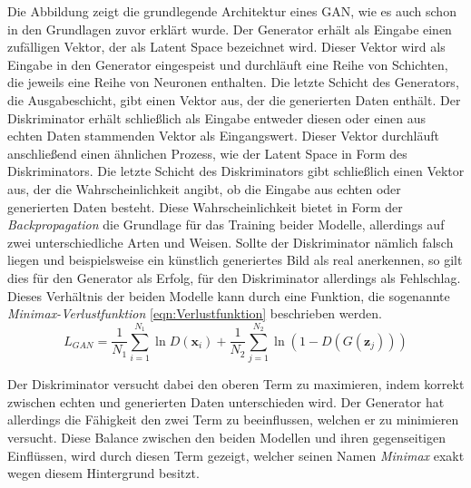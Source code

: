     \noindent Die Abbildung zeigt die grundlegende Architektur eines \ac{GAN}, wie es auch schon in den Grundlagen zuvor erklärt wurde. Der Generator erhält als Eingabe einen zufälligen Vektor, der als Latent Space bezeichnet wird. Dieser Vektor wird als Eingabe in den Generator eingespeist und durchläuft eine Reihe von Schichten, die jeweils eine Reihe von Neuronen enthalten. Die letzte Schicht des Generators, die Ausgabeschicht, gibt einen Vektor aus, der die generierten Daten enthält. Der Diskriminator erhält schließlich als Eingabe entweder diesen oder einen aus echten Daten stammenden Vektor als Eingangswert. Dieser Vektor durchläuft anschließend einen ähnlichen Prozess, wie der Latent Space in Form des Diskriminators. Die letzte Schicht des Diskriminators gibt schließlich einen Vektor aus, der die Wahrscheinlichkeit angibt, ob die Eingabe aus echten oder generierten Daten besteht. Diese Wahrscheinlichkeit bietet in Form der \textit{Backpropagation} die Grundlage für das Training beider Modelle, allerdings auf zwei unterschiedliche Arten und Weisen. Sollte der Diskriminator nämlich falsch liegen und beispielsweise ein künstlich generiertes Bild als real anerkennen, so gilt dies für den Generator als Erfolg, für den Diskriminator allerdings als Fehlschlag. Dieses Verhältnis der beiden Modelle kann durch eine Funktion, die sogenannte \textit{Minimax-Verlustfunktion} \ref{eqn:Verlustfunktion} beschrieben werden.\\

    \begin{equation}
        \label{eqn:Verlustfunktion}
        L_{GAN}=\frac{1}{N_1}\sum_{i=1}^{N_1} \ln{D (\textbf{x}_i)} + \frac{1}{N_2}\sum_{j=1}^{N_2} \ln{(1-D (G (\textbf{z}_j)))}
        \end{equation}

    \noindent Der Diskriminator versucht dabei den oberen Term zu maximieren, indem korrekt zwischen echten und generierten Daten unterschieden wird. Der Generator hat allerdings die Fähigkeit den zwei Term zu beeinflussen, welchen er zu minimieren versucht. Diese Balance zwischen den beiden Modellen und ihren gegenseitigen Einflüssen, wird durch diesen Term gezeigt, welcher seinen Namen \textit{Minimax} exakt wegen diesem Hintergrund besitzt. 

    
    

\newpage